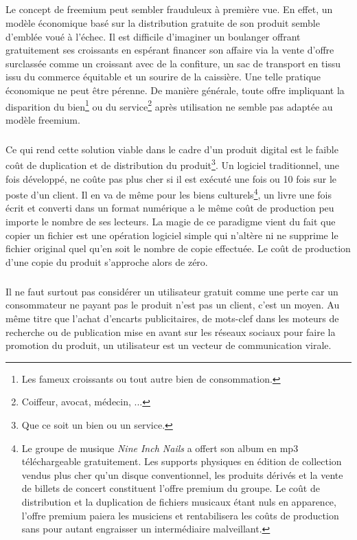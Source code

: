 \documentclass[11pt, a4paper ]{article}
\begin{document}
\begin{spacing}{1.5}
\paragraph{} %
	\subparagraph{} %
Le concept de freemium peut sembler frauduleux à première vue. En effet, un modèle économique basé sur la distribution gratuite de son produit semble d’emblée voué à l'échec. Il est difficile d'imaginer un boulanger offrant gratuitement ses croissants en espérant financer son affaire via la vente d'offre surclassée comme un croissant avec de la confiture, un sac de transport en tissu issu du commerce équitable et un sourire de la caissière. Une telle pratique économique ne peut être pérenne. De manière générale, toute offre impliquant la disparition du bien\footnote{Les fameux croissants ou tout autre bien de consommation.} ou du service\footnote{Coiffeur, avocat, médecin, ...} après utilisation ne semble pas adaptée au modèle freemium.

\subparagraph{}
Ce qui rend cette solution viable dans le cadre d'un produit digital est le faible coût de duplication et de distribution du produit\footnote{Que ce soit un bien ou un service.}. Un logiciel traditionnel, une fois développé, ne coûte pas plus cher si il est exécuté une fois ou 10 fois sur le poste d'un client. Il en va de même pour les biens culturels\footnote{Le groupe de musique \emph{Nine Inch Nails} a offert son album en mp3 téléchargeable gratuitement. Les supports physiques en édition de collection vendus plus cher qu'un disque conventionnel, les produits dérivés et la vente de billets de concert constituent l'offre premium du groupe. Le coût de distribution et la duplication de fichiers musicaux étant nuls en apparence, l'offre premium paiera les musiciens et rentabilisera les coûts de production sans pour autant engraisser un intermédiaire malveillant.}, un livre une fois écrit et converti dans un format numérique a le même coût de production peu importe le nombre de ses lecteurs. La magie de ce paradigme vient du fait que copier un fichier est une opération logiciel simple qui n’altère ni ne supprime le fichier original quel qu’en soit le nombre de copie effectuée. Le coût de production d'une copie du produit s'approche alors de zéro.

\subparagraph{}
Il ne faut surtout pas considérer un utilisateur gratuit comme une perte car un consommateur ne payant pas le produit n'est pas un client, c'est un moyen. Au même titre que l'achat d’encarts publicitaires, de mots-clef dans les moteurs de recherche ou de publication mise en avant sur les réseaux sociaux pour faire la promotion du produit, un utilisateur est un vecteur de communication virale.




\end{spacing}
\end{document}
